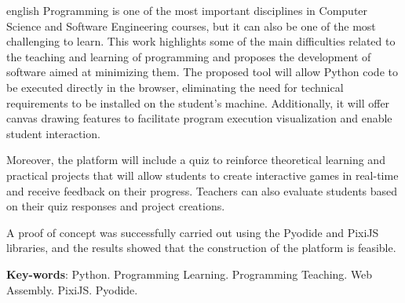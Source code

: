 \begin{resumo}[Abstract]
 \begin{otherlanguage*}{english}
  Programming is one of the most important disciplines in Computer Science and Software Engineering courses, but it can also be one of the most challenging to learn. This work highlights some of the main difficulties related to the teaching and learning of programming and proposes the development of software aimed at minimizing them. The proposed tool will allow Python code to be executed directly in the browser, eliminating the need for technical requirements to be installed on the student's machine. Additionally, it will offer canvas drawing features to facilitate program execution visualization and enable student interaction.

  Moreover, the platform will include a quiz to reinforce theoretical learning and practical projects that will allow students to create interactive games in real-time and receive feedback on their progress. Teachers can also evaluate students based on their quiz responses and project creations.

  A proof of concept was successfully carried out using the Pyodide and PixiJS libraries, and the results showed that the construction of the platform is feasible.

   \vspace{\onelineskip}
 
   \noindent 
   \textbf{Key-words}: Python. Programming Learning. Programming Teaching. Web Assembly. PixiJS. Pyodide.
 \end{otherlanguage*}
\end{resumo}
